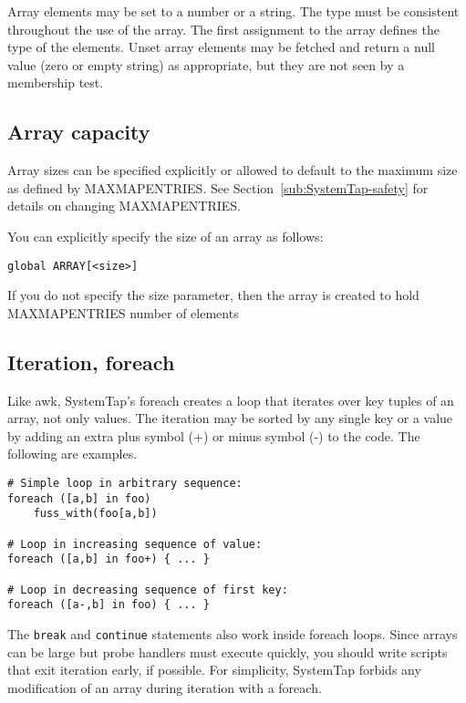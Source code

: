 \documentclass[twoside,english]{article}
\newenvironment{vindent}
{\begin{list}{}{\setlength{\listparindent}{6pt}}
\item[]}
{\end{list}}
\begin{document}
Array elements may be set to a number or a string. The type must be consistent
throughout the use of the array. The first assignment to the array defines
the type of the elements. Unset array elements may be fetched and return
a null value (zero or empty string) as appropriate, but they are not seen
by a membership test.


\subsection{Array capacity}

Array sizes can be specified explicitly or allowed to default to the maximum
size as defined by MAXMAPENTRIES. See Section~\ref{sub:SystemTap-safety}
for details on changing MAXMAPENTRIES.

You can explicitly specify the size of an array as follows:

\begin{vindent}
\begin{verbatim}
global ARRAY[<size>]
\end{verbatim}
\end{vindent}
If you do not specify the size parameter, then the array is created to hold
MAXMAPENTRIES number of elements


\subsection{Iteration, foreach}
Like awk, SystemTap's foreach creates a loop that iterates over key tuples
of an array, not only values. The iteration may be sorted by any single key
or a value by adding an extra plus symbol (+) or minus symbol (-) to the
code. The following are examples.

\begin{vindent}
\begin{verbatim}
# Simple loop in arbitrary sequence:
foreach ([a,b] in foo)
    fuss_with(foo[a,b])

# Loop in increasing sequence of value:
foreach ([a,b] in foo+) { ... }

# Loop in decreasing sequence of first key:
foreach ([a-,b] in foo) { ... }
\end{verbatim}
\end{vindent}
The \texttt{break} and \texttt{continue} statements also work inside foreach
loops. Since arrays can be large but probe handlers must execute quickly,
you should write scripts that exit iteration early, if possible. For simplicity,
SystemTap forbids any modification of an array during iteration with a foreach.
\end{document}
